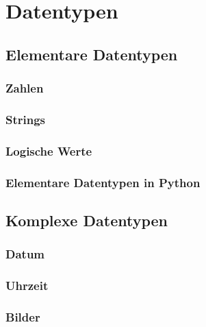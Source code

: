 \documentclass[
  oneside]{book}
\begin{document}
\hypertarget{datentypen-1}{%
\section{Datentypen}\label{datentypen-1}}

\hypertarget{elementare-datentypen}{%
\subsection{Elementare Datentypen}\label{elementare-datentypen}}

\hypertarget{zahlen}{%
\subsubsection{Zahlen}\label{zahlen}}

\hypertarget{strings}{%
\subsubsection{Strings}\label{strings}}

\hypertarget{logische-werte}{%
\subsubsection{Logische Werte}\label{logische-werte}}

\hypertarget{elementare-datentypen-in-python}{%
\subsubsection{Elementare Datentypen in Python}\label{elementare-datentypen-in-python}}

\hypertarget{komplexe-datentypen}{%
\subsection{Komplexe Datentypen}\label{komplexe-datentypen}}

\hypertarget{datum}{%
\subsubsection{Datum}\label{datum}}

\hypertarget{uhrzeit}{%
\subsubsection{Uhrzeit}\label{uhrzeit}}

\hypertarget{bilder}{%
\subsubsection{Bilder}\label{bilder}}
\end{document}
